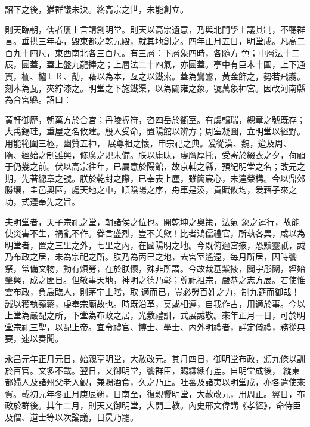 \begin{pinyinscope}
 詔下之後，猶群議未決。終高宗之世，未能創立。



 則天臨朝，儒者屢上言請創明堂。則天以高宗遺意，乃與北門學士議其制，不聽群言。垂拱三年春，毀東都之乾元殿，就其地創之。四年正月五日，明堂成。凡高二百九十四尺，東西南北各三百尺。有三層：下層象四時，各隨方
 色；中層法十二辰，圓蓋，蓋上盤九龍捧之；上層法二十四氣，亦圓蓋。亭中有巨木十圍，上下通貫，栭、櫨ＬＲ、勣，藉以為本，亙之以鐵索。蓋為鸞鷟，黃金飾之，勢若飛翥。刻木為瓦，夾紵漆之。明堂之下施鐵渠，以為闢雍之象。號萬象神宮。因改河南縣為合宮縣。詔曰：



 黃軒御歷，朝萬方於合宮；丹陵握符，咨四岳於衢室。有虞輯瑞，總章之號既存；大禹錫珪，重屋之名攸建。殷人受命，置陽館以辨方；周室凝圖，立明堂以經野。用能範圍三極，幽贊五神，
 展尊祖之懷，申宗祀之典。爰從漢、魏，迨及周、隋、經始之制雖興，修廣之規未備。朕以庸昧，虔膺厚托，受寄於綴衣之夕，荷顧于仍幾之前。伏以高宗往年，已屬意於陽館，故京輔之縣，預紀明堂之名；改元之期，先著總章之號。朕於乾封之際，已奉表上塵，雖簡宸心，未遑榮構。今以鼎郊勝壤，圭邑奧區，處天地之中，順陰陽之序，舟車是湊，貢賦攸均，爰藉子來之功，式遵奉先之旨。



 夫明堂者，天子宗祀之堂，朝諸侯之位也。開乾坤之奧策，法氣
 象之運行，故能使災害不生，禍亂不作。眷言盛烈，豈不美歟！比者鴻儒禮官，所執各異，咸以為明堂者，置之三里之外，七里之內，在國陽明之地。今既俯邇宮掖，恐黷靈祇，誠乃布政之居，未為宗祀之所。朕乃為丙巳之地，去宮室遙遠，每月所居，因時饗祭，常備文物，動有煩勞，在於朕懷，殊非所謂。今故裁基紫掖，闢宇彤闈，經始肇興，成之匪日。但敬事天地，神明之德乃彰；尊祀祖宗，嚴恭之志方展。若使惟雲布政，負扆臨人，則茅宇土階，取
 適而已，豈必勞百姓之力，制九筵而御哉！誠以獲執蘋蘩，虔奉宗廟故也。時既沿革，莫或相遵，自我作古，用適於事。今以上堂為嚴配之所，下堂為布政之居，光敷禮訓，式展誠敬。來年正月一日，可於明堂宗祀三聖，以配上帝。宜令禮官、博士、學士、內外明禮者，詳定儀禮，務從典要，速以奏聞。



 永昌元年正月元日，始親享明堂，大赦改元。其月四日，御明堂布政，頒九條以訓於百官。文多不載。翌日，又御明堂，饗群臣，賜縑纁有差。自明堂成後，
 縱東都婦人及諸州父老入觀，兼賜酒食，久之乃止。吐蕃及諸夷以明堂成，亦各遣使來賀。載初元年冬正月庚辰朔，日南至，復親饗明堂，大赦改元，用周正。翼日，布政於群後。其年二月，則天又御明堂，大開三教。內史邢文偉講《孝經》，命侍臣及僧、道士等以次論議，日昃乃罷。




\end{pinyinscope}
